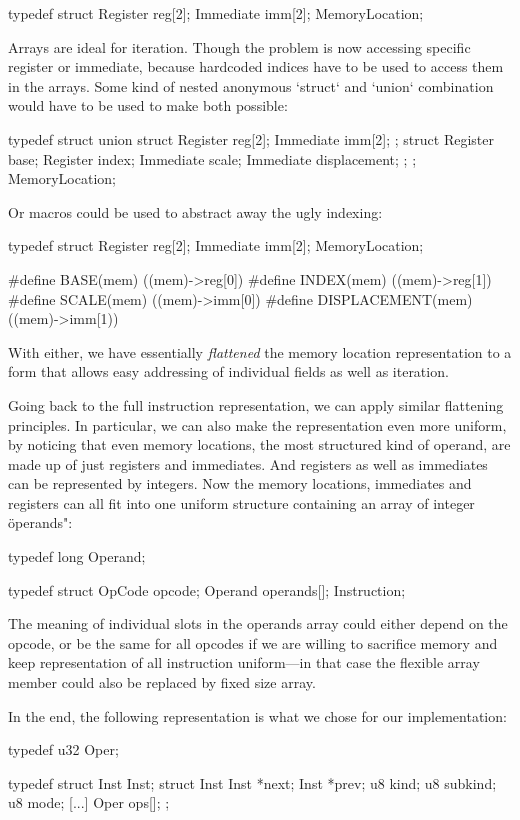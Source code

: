 \begtt
typedef struct {
	Register reg[2];
	Immediate imm[2];
} MemoryLocation;
\endtt

Arrays are ideal for iteration. Though the problem is now accessing specific
register or immediate, because hardcoded indices have to be used to access them
in the arrays. Some kind of nested anonymous `struct` and `union` combination
would have to be used to make both possible:

\begtt
typedef struct {
	union {
		struct {
			Register reg[2];
			Immediate imm[2];
		};
		struct {
			Register base;
			Register index;
			Immediate scale;
			Immediate displacement;
		};
	};
} MemoryLocation;
\endtt

Or macros could be used to abstract away the ugly indexing:

\begtt
typedef struct {
	Register reg[2];
	Immediate imm[2];
} MemoryLocation;

#define BASE(mem)         ((mem)->reg[0])
#define INDEX(mem)        ((mem)->reg[1])
#define SCALE(mem)        ((mem)->imm[0])
#define DISPLACEMENT(mem) ((mem)->imm[1))
\endtt

With either, we have essentially {\em flattened} the memory location
representation to a form that allows easy addressing of individual fields as
well as iteration.

Going back to the full instruction representation, we can apply similar
flattening principles. In particular, we can also make the representation even
more uniform, by noticing that even memory locations, the most structured kind
of operand, are made up of just registers and immediates. And registers as well
as immediates can be represented by integers. Now the memory locations,
immediates and registers can all fit into one uniform structure containing an
array of integer \"operands":

\begtt
typedef long Operand;

typedef struct {
	OpCode opcode;
	Operand operands[];
} Instruction;
\endtt

The meaning of individual slots in the operands array could either depend on the
opcode, or be the same for all opcodes if we are willing to sacrifice memory and
keep representation of all instruction uniform---in that case the flexible array
member could also be replaced by fixed size array.

In the end, the following representation is what we chose for our implementation:

\begtt
typedef u32 Oper;

typedef struct Inst Inst;
struct Inst {
	Inst *next;
	Inst *prev;
	u8 kind;
	u8 subkind;
	u8 mode;
	[...]
	Oper ops[];
};
\endtt

